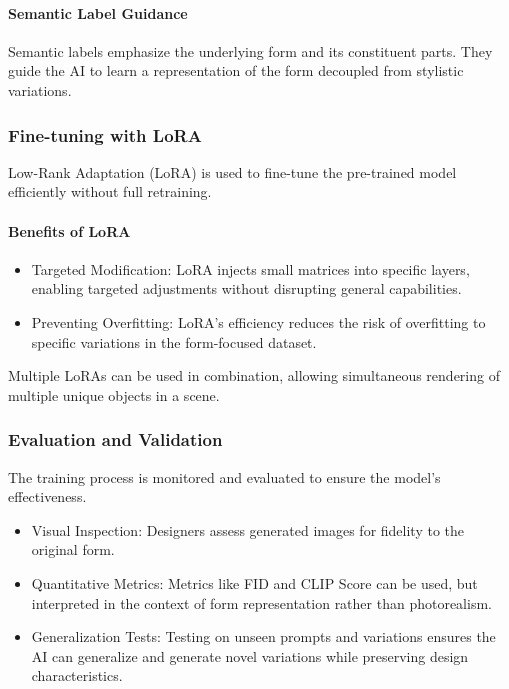 \documentclass[12pt]{article}
\begin{document}
\paragraph{Semantic Label Guidance}
Semantic labels emphasize the underlying form and its constituent parts. They guide the AI to learn a representation of the form decoupled from stylistic variations.


\subsubsection{Fine-tuning with LoRA}
Low-Rank Adaptation (LoRA) is used to fine-tune the pre-trained model efficiently without full retraining.

\paragraph{Benefits of LoRA}
\begin{itemize}
    \item Targeted Modification: LoRA injects small matrices into specific layers, enabling targeted adjustments without disrupting general capabilities.
    \item Preventing Overfitting: LoRA's efficiency reduces the risk of overfitting to specific variations in the form-focused dataset.
\end{itemize}

Multiple LoRAs can be used in combination, allowing simultaneous rendering of multiple unique objects in a scene.

\subsubsection{Evaluation and Validation}
The training process is monitored and evaluated to ensure the model's effectiveness.

\begin{itemize}
    \item Visual Inspection: Designers assess generated images for fidelity to the original form.
    \item Quantitative Metrics: Metrics like FID and CLIP Score can be used, but interpreted in the context of form representation rather than photorealism.
    \item Generalization Tests: Testing on unseen prompts and variations ensures the AI can generalize and generate novel variations while preserving design characteristics.
\end{itemize}
\end{document}
